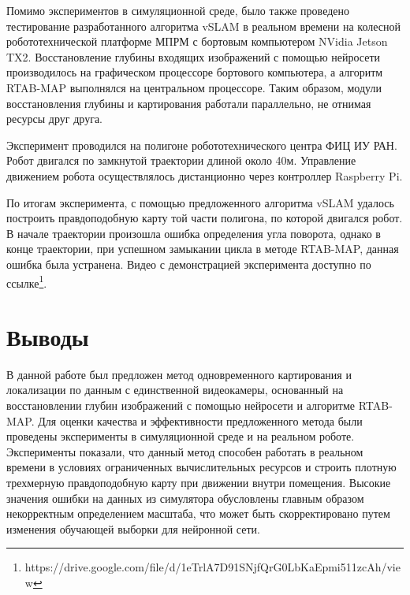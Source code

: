 \documentclass{mipt-thesis-ms}
\begin{document}
	Помимо экспериментов в симуляционной среде, было также проведено тестирование разработанного алгоритма vSLAM в реальном времени на колесной робототехнической платформе МПРМ с бортовым компьютером NVidia Jetson TX2. Восстановление глубины входящих изображений с помощью нейросети производилось на графическом процессоре бортового компьютера, а алгоритм RTAB-MAP выполнялся на центральном процессоре. Таким образом, модули восстановления глубины и картирования работали параллельно, не отнимая ресурсы друг друга.
	
	Эксперимент проводился на полигоне робототехнического центра ФИЦ ИУ РАН. Робот двигался по замкнутой траектории длиной около 40м. Управление движением робота осуществлялось дистанционно через контроллер Raspberry Pi.
	
	По итогам эксперимента, с помощью предложенного алгоритма vSLAM удалось построить правдоподобную карту той части полигона, по которой двигался робот. В начале траектории произошла ошибка определения угла поворота, однако в конце траектории, при успешном замыкании цикла в методе RTAB-MAP, данная ошибка была устранена. Видео с демонстрацией эксперимента доступно по ссылке\footnote{https://drive.google.com/file/d/1eTrlA7D91SNjfQrG0LbKaEpmi511zcAh/view}.
	
	\section{Выводы}
	
	В данной работе был предложен метод одновременного картирования и локализации по данным с единственной видеокамеры, основанный на восстановлении глубин изображений с помощью нейросети и алгоритме RTAB-MAP. Для оценки качества и эффективности предложенного метода были проведены эксперименты в симуляционной среде и на реальном роботе. Эксперименты показали, что данный метод способен работать в реальном времени в условиях ограниченных вычислительных ресурсов и строить плотную трехмерную правдоподобную карту при движении внутри помещения. Высокие значения ошибки на данных из симулятора обусловлены главным образом некорректным определением масштаба, что может быть скорректировано путем изменения обучающей выборки для нейронной сети.
	
	
\end{document}
